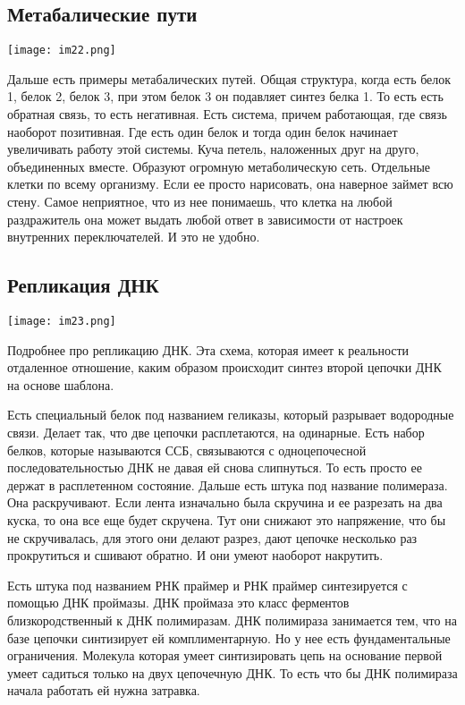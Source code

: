\subsection{Метабалические пути}
\texttt{[image: im22.png]}

Дальше есть примеры метабалических путей. Общая структура, когда 
есть белок 1, белок 2, белок 3, при этом белок 3 он подавляет синтез белка 1. 
То есть есть обратная связь, то есть негативная. Есть система, причем работающая, 
где связь наоборот позитивная. Где есть один белок и 
тогда один белок начинает увеличивать работу этой системы. Куча петель, наложенных 
друг на друго, объединенных вместе. Образуют огромную метаболическую сеть. Отдельные клетки 
по всему организму. Если ее просто нарисовать, она наверное займет всю стену. Самое 
неприятное, что из нее понимаешь, что клетка на любой раздражитель она может выдать 
любой ответ в зависимости от настроек внутренних переключателей. И это не удобно. 

\subsection{Репликация ДНК}
\texttt{[image: im23.png]}

Подробнее про репликацию ДНК. Эта схема, которая имеет к реальности 
отдаленное отношение, каким образом происходит синтез второй цепочки ДНК на 
основе шаблона. 

Есть специальный белок под названием геликазы, который разрывает водородные связи. 
Делает так, что две цепочки расплетаются, на одинарные. Есть набор 
белков, которые называются ССБ, связываются с одноцепочесной последовательностью ДНК
не давая ей снова слипнуться. То есть просто ее держат в расплетенном состояние. 
Дальше есть штука под название полимераза.  Она раскручивают. Если лента изначально была 
скручина и ее разрезать на два куска, то она все еще будет скручена. Тут они снижают это 
напряжение, что бы не скручивалась, для этого они делают разрез, дают 
цепочке несколько раз прокрутиться и сшивают обратно. И они 
умеют наоборот накрутить. 

Есть штука под названием РНК праймер и РНК праймер синтезируется с помощью
ДНК проймазы. ДНК проймаза это класс ферментов близкородственный к ДНК 
полимиразам. ДНК полимираза занимается тем, что на базе 
цепочки синтизирует ей комплиментарную. Но у нее есть фундаментальные ограничения. 
Молекула которая умеет синтизировать цепь на основание первой умеет садиться 
только на двух цепочечную ДНК. То есть что бы ДНК полимираза начала работать 
ей нужна затравка. 

